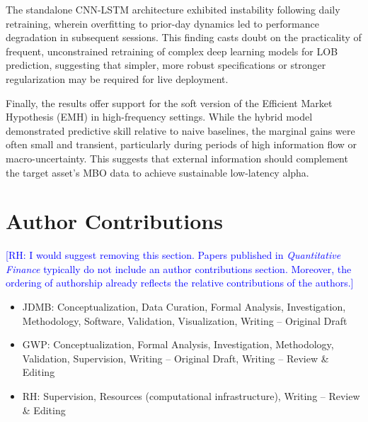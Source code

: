 \documentclass[10pt,a4paper,oneside]{article}
\newcommand{\rh}[1]{\textcolor{blue}{\textsf{[RH: #1]}}}
\begin{document}
The standalone CNN-LSTM architecture exhibited instability following daily retraining, wherein overfitting to prior-day dynamics led to performance degradation in subsequent sessions. This finding casts doubt on the practicality of frequent, unconstrained retraining of complex deep learning models for LOB prediction, suggesting that simpler, more robust specifications or stronger regularization may be required for live deployment.

Finally, the results offer support for the soft version of the Efficient Market Hypothesis (EMH) in high-frequency settings. While the hybrid model demonstrated predictive skill relative to naive baselines, the marginal gains were often small and transient, particularly during periods of high information flow or macro-uncertainty. This suggests that external information should complement the target asset's MBO data to achieve sustainable low-latency alpha.



\section{Author Contributions}
\rh{I would suggest removing this section. Papers published in \emph{Quantitative Finance} typically do not include an author contributions section. Moreover, the ordering of authorship already reflects the relative contributions of the authors.}
\begin{itemize}
    \item JDMB: Conceptualization, Data Curation, Formal Analysis, Investigation, Methodology, Software, Validation, Visualization, Writing – Original Draft
    \item GWP: Conceptualization, Formal Analysis, Investigation, Methodology, Validation, Supervision, Writing – Original Draft, Writing – Review \& Editing 
    \item RH: Supervision, Resources (computational infrastructure), Writing – Review \& Editing
\end{itemize}

\newpage




\newpage
\end{document}
